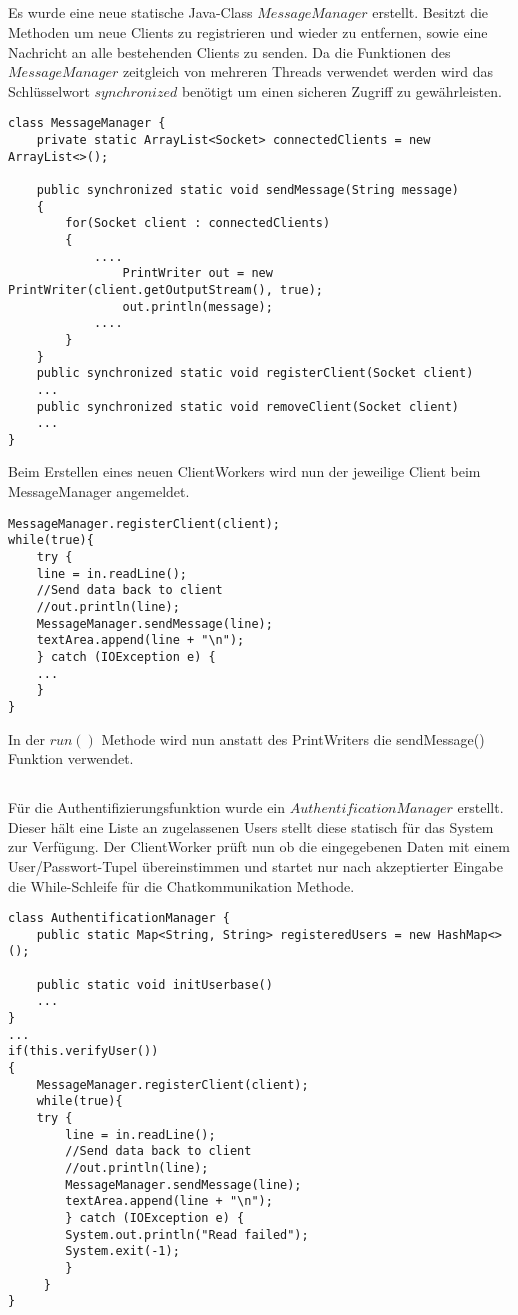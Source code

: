 \documentclass[12pt]{article}
\theoremstyle{plain}
\begin{document}
\subsection{}
Es wurde eine neue statische Java-Class $MessageManager$ erstellt.
Besitzt die Methoden um neue Clients zu registrieren und wieder zu entfernen, sowie eine Nachricht an alle bestehenden Clients zu senden.
Da die Funktionen des $MessageManager$ zeitgleich von mehreren Threads verwendet werden wird das Schlüsselwort $synchronized$ benötigt um einen sicheren Zugriff zu gewährleisten.
\begin{lstlisting}
class MessageManager {
	private static ArrayList<Socket> connectedClients = new ArrayList<>();

	public synchronized static void sendMessage(String message)
	{
		for(Socket client : connectedClients)
		{
			....			
				PrintWriter out = new PrintWriter(client.getOutputStream(), true);
				out.println(message);
			....
		}
	}
	public synchronized static void registerClient(Socket client)
	...
	public synchronized static void removeClient(Socket client)
	...
}
\end{lstlisting}
Beim Erstellen eines neuen ClientWorkers wird nun der jeweilige Client beim MessageManager angemeldet.
\begin{lstlisting}
MessageManager.registerClient(client);
while(true){
	try {
	line = in.readLine();
	//Send data back to client
	//out.println(line);
	MessageManager.sendMessage(line);
	textArea.append(line + "\n");
	} catch (IOException e) {
	...
	}
}
\end{lstlisting}
In der $run()$ Methode wird nun anstatt des PrintWriters die sendMessage() Funktion verwendet.
\subsection{}
Für die Authentifizierungsfunktion wurde ein $AuthentificationManager$ erstellt.
Dieser hält eine Liste an zugelassenen Users stellt diese statisch für das System zur Verfügung.
Der ClientWorker prüft nun ob die eingegebenen Daten mit einem User/Passwort-Tupel übereinstimmen und startet nur nach akzeptierter Eingabe die While-Schleife für die Chatkommunikation Methode.
\begin{lstlisting}
class AuthentificationManager {
	public static Map<String, String> registeredUsers = new HashMap<>();

	public static void initUserbase()
	...
}
...
if(this.verifyUser())
{
	MessageManager.registerClient(client);
	while(true){
	try {
		line = in.readLine();
		//Send data back to client
		//out.println(line);
		MessageManager.sendMessage(line);
		textArea.append(line + "\n");
		} catch (IOException e) {
		System.out.println("Read failed");
		System.exit(-1);
		}
	 }
}
\end{lstlisting}
\end{document}
